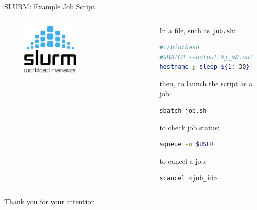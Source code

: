 \begin{frame}[fragile]{SLURM: Example Job Script}
    \begin{columns}
        \begin{column}{0.4\textwidth}
            \begin{figure}
                \centering
                \includegraphics[width=0.5\textwidth]{images/slurm_logo.png}
            \end{figure}
        \end{column}
        \begin{column}{0.6\textwidth}
            In a file, such as \texttt{job.sh}:
            \begin{lstlisting}[language=bash]
#!/bin/bash
#SBATCH --output %j_%N.out
hostname ; sleep ${1:-30}
            \end{lstlisting}
            then, to launch the script as a job:
            \begin{lstlisting}[language=bash]
sbatch job.sh
            \end{lstlisting}
            to check job status:
            \begin{lstlisting}[language=bash]
squeue -u $USER 
            \end{lstlisting}
            to cancel a job:
            \begin{lstlisting}[language=bash]
scancel <job_id>
            \end{lstlisting}
        \end{column}
    \end{columns}
\end{frame}

\begin{frame}{}
    \centering
    \Large{Thank you for your attention}
\end{frame}



